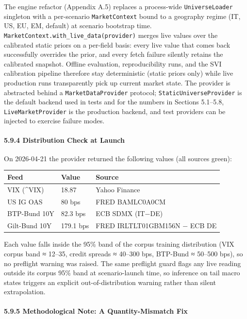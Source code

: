 \documentclass[
]{article}
\begin{document}
The engine refactor (Appendix A.5) replaces a process-wide
\texttt{UniverseLoader} singleton with a per-scenario
\texttt{MarketContext} bound to a geography regime (IT, US, EU, EM,
default) at scenario bootstrap time.
\texttt{MarketContext.with\_live\_data(provider)} merges live values
over the calibrated static priors on a per-field basis: every live value
that comes back successfully overrides the prior, and every fetch
failure silently retains the calibrated snapshot. Offline evaluation,
reproducibility runs, and the SVI calibration pipeline therefore stay
deterministic (static priors only) while live production runs
transparently pick up current market state. The provider is abstracted
behind a \texttt{MarketDataProvider} protocol;
\texttt{StaticUniverseProvider} is the default backend used in tests and
for the numbers in Sections 5.1--5.8, \texttt{LiveMarketProvider} is the
production backend, and test providers can be injected to exercise
failure modes.

\paragraph{5.9.4 Distribution Check at
Launch}\label{distribution-check-at-launch}

On 2026-04-21 the provider returned the following values (all sources
green):

\begin{longtable}[]{@{}lll@{}}
\toprule\noalign{}
Feed & Value & Source \\
\midrule\noalign{}
\endhead
\bottomrule\noalign{}
\endlastfoot
VIX (\^{}VIX) & 18.87 & Yahoo Finance \\
US IG OAS & 80 bps & FRED BAMLC0A0CM \\
BTP-Bund 10Y & 82.3 bps & ECB SDMX (IT−DE) \\
Gilt-Bund 10Y & 179.1 bps & FRED IRLTLT01GBM156N − ECB DE \\
\end{longtable}

Each value falls inside the 95\% band of the corpus training
distribution (VIX corpus band ≈ 12--35, credit spreads ≈ 40--300 bps,
BTP-Bund ≈ 50--500 bps), so no preflight warning was raised. The same
preflight guard flags any live reading outside its corpus 95\% band at
scenario-launch time, so inference on tail macro states triggers an
explicit out-of-distribution warning rather than silent extrapolation.

\paragraph{5.9.5 Methodological Note: A Quantity-Mismatch
Fix}\label{methodological-note-a-quantity-mismatch-fix}
\end{document}
